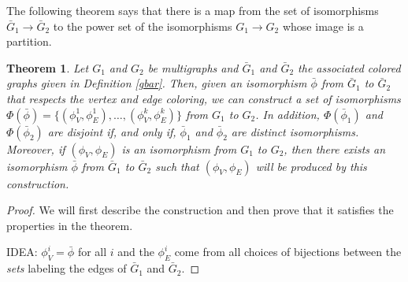 \documentclass[amsmath,secnumarabic,floatfix,amssymb,nofootinbib,nobibnotes,letterpaper,11pt,tightenlines,showkeys]{revtex4}
\newtheorem{theorem}{Theorem}
\theoremstyle{definition}
\newtheorem{definition}[theorem]{Definition}
\let\mgp=\marginpar \marginparwidth18mm \marginparsep1mm
\def\marginpar#1{\mgp{\raggedright\tiny #1}}
\let\lbl=\label
\def\label#1{\lbl{#1}\ifinner\else\marginpar{\ref{#1} #1}\ignorespaces\fi}
\begin{document}

%	
%

The following theorem says that there is a map from the set of isomorphisms $\bar{G}_1 \rightarrow \bar{G}_2$ to the power set of the isomorphisms $G_1 \rightarrow G_2$ whose image is a partition.

\begin{theorem}
	Let $G_1$ and $G_2$ be multigraphs and $\bar{G}_1$ and $\bar{G}_2$ the associated colored graphs given in Definition \ref{gbar}. Then, given an isomorphism $\bar{\phi}$ from $\bar{G}_1$ to $\bar{G}_2$ that respects the vertex and edge coloring, we can construct a set of isomorphisms $\Phi(\bar{\phi}) = \{(\phi^1_V,\phi^1_E),\ldots,(\phi^k_V,\phi^k_E)\}$ from $G_1$ to $G_2$. In addition, $\Phi(\bar{\phi}_1)$ and $\Phi(\bar{\phi}_2) $ are disjoint if, and only if, $\bar{\phi}_1$ and $\bar{\phi}_2$ are distinct isomorphisms. Moreover, if $(\phi_V,\phi_E)$ is an isomorphism from $G_1$ to $G_2$, then there exists an isomorphism $\bar{\phi}$ from $\bar{G}_1$ to $\bar{G}_2$ such that $(\phi_V,\phi_E)$ will be produced by this construction. 
\end{theorem}

\begin{proof}
	We will first describe the construction and then prove that it satisfies the properties in the theorem.

	IDEA: $\phi^i_V = \bar{\phi}$ for all $i$ and the $\phi^i_E$ come from all choices of bijections between the \emph{sets} labeling the edges of $\bar{G}_1$ and $\bar{G}_2$.

	
\end{proof}


\end{document}
